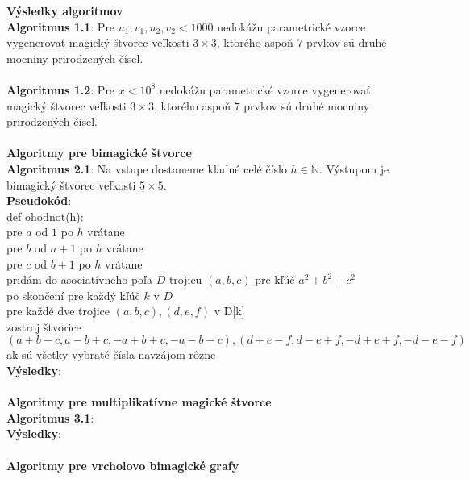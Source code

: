 \documentclass[12pt]{article}
\begin{document}
\textbf{Výsledky algoritmov} \\

\textbf{Algoritmus 1.1}: Pre $u_1, v_1, u_2, v_2 < 1000$ nedokážu parametrické vzorce vygenerovať magický štvorec veľkosti $3 \times 3$, ktorého aspoň $7$ prvkov sú druhé mocniny prirodzených čísel. \\\\

\textbf{Algoritmus 1.2}: Pre $x < 10^8$ nedokážu parametrické vzorce vygenerovať magický štvorec veľkosti $3 \times 3$, ktorého aspoň $7$ prvkov sú druhé mocniny prirodzených čísel. \\\\

\textbf{Algoritmy pre bimagické štvorce} \\

\textbf{Algoritmus 2.1}: Na vstupe dostaneme kladné celé číslo $h \in \mathbb{N}$. Výstupom je bimagický štvorec veľkosti $5 \times 5$. \\

\textbf{Pseudokód}: \\
def ohodnot(h): \\
pre $a$ od $1$ po $h$ vrátane \\
pre $b$ od $a+1$ po $h$ vrátane \\
pre $c$ od $b+1$ po $h$ vrátane \\
pridám do asociatívneho poľa $D$ trojicu $(a,b,c)$ pre kľúč $a^2+b^2+c^2$ \\
po skončení pre každý kľúč $k$ v $D$ \\
pre každé dve trojice $(a,b,c), (d,e,f)$ v D[k] \\
zostroj štvorice $(a+b-c, a-b+c, -a+b+c, -a-b-c), (d+e-f, d-e+f, -d+e+f, -d-e-f)$ \\
ak sú všetky vybraté čísla navzájom rôzne \\


\textbf{Výsledky}: \\\\

\textbf{Algoritmy pre multiplikatívne magické štvorce} \\

\textbf{Algoritmus 3.1}: \\

\textbf{Výsledky}: \\\\

\textbf{Algoritmy pre vrcholovo bimagické grafy} \\
 
\end{document}
